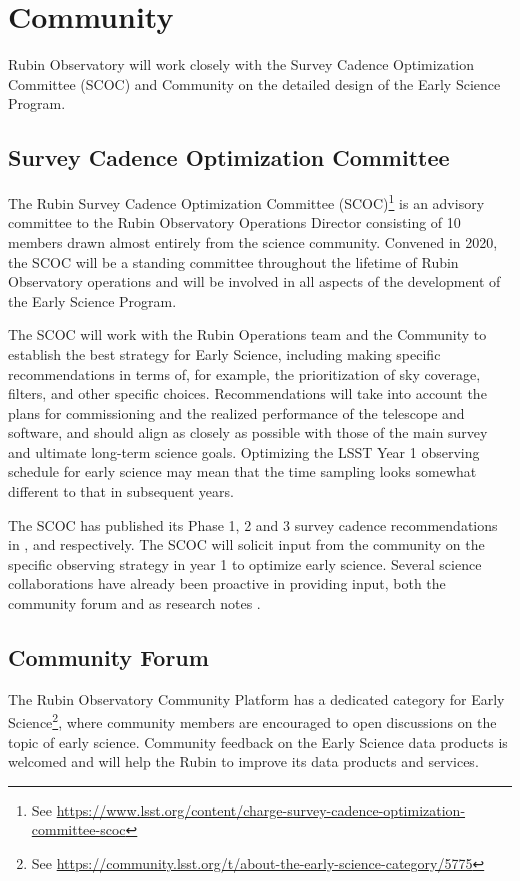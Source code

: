 \section{Community}
\label{sec:community}
Rubin Observatory will work closely with the Survey Cadence Optimization Committee (SCOC) and Community on the detailed design of the Early Science Program.

\subsection{Survey Cadence Optimization Committee}
The Rubin Survey Cadence Optimization Committee (SCOC)\footnote{See \url{https://www.lsst.org/content/charge-survey-cadence-optimization-committee-scoc}} is an advisory committee to the Rubin Observatory Operations Director consisting of 10 members drawn almost entirely from the science community.
Convened in 2020, the SCOC will be a standing committee throughout the lifetime of Rubin Observatory operations and will be involved in all aspects of the development of the Early Science Program.

The SCOC will work with the Rubin Operations team and the Community to establish the best strategy for Early Science, including making specific recommendations in terms of, for example, the prioritization of sky coverage, filters, and other specific choices.
Recommendations will take into account the plans for commissioning and the realized performance of the telescope and software, and should align as closely as possible with those of the main survey and ultimate long-term science goals.
Optimizing the LSST Year 1 observing schedule for early science may mean that the time sampling looks somewhat different to that in subsequent years.

The SCOC has published its Phase 1, 2  and 3 survey cadence recommendations in ,  and  respectively.
The SCOC will solicit input from the community on the specific observing strategy in year 1 to optimize early science.
Several science collaborations have already been proactive in providing input,  both the community forum and as research notes \citep[][]{2021RNAAS...5..143S,2020RNAAS...4...40H,2020RNAAS...4...41S}.

\subsection{Community Forum}
\label{ssec:forum}
The Rubin Observatory Community Platform has a dedicated category for Early Science\footnote{See \url{https://community.lsst.org/t/about-the-early-science-category/5775}}, where community members are encouraged to open discussions on the topic of early science.
Community feedback on the Early Science data products is welcomed and will help the Rubin to improve its data products and services.
